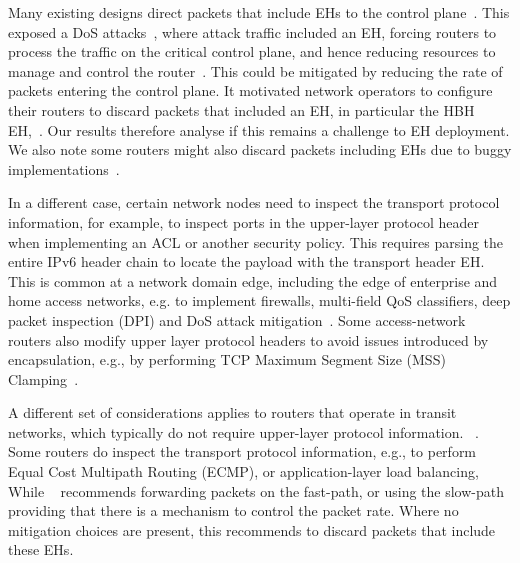 \documentclass[conference]{IEEEtran}
\begin{document}
Many existing designs direct packets that include EHs to the control plane~\cite{ietf-v6ops-hbh-03}.  This exposed a DoS attacks~\cite{naagas2021deh}, where attack traffic included an EH, forcing routers to process the traffic on the critical control plane, and hence reducing resources to manage and control the router~\cite{router-architecture}. This could be mitigated  by reducing the rate of packets entering the control plane. It motivated network operators to configure their routers to discard packets that included an EH, in particular the HBH EH,~\cite{passive-threats}. Our results therefore analyse if this remains a challenge to EH deployment.
We also note some routers might also discard packets including EHs due to buggy implementations~\cite{passive-threats}.

In a different case, certain network nodes need to inspect the transport protocol information, for example, to inspect ports in the upper-layer protocol header when implementing an ACL or another security policy. This requires parsing the entire IPv6 header chain to locate the payload with the transport header EH.
This is common at a network domain edge, including the edge of enterprise and home access networks, e.g. to implement firewalls, multi-field QoS classifiers, deep packet inspection (DPI) and DoS attack mitigation~\cite{lb-classification}. Some access-network routers also modify upper layer protocol headers to avoid issues introduced by encapsulation, e.g., by performing TCP Maximum Segment Size (MSS) Clamping~\cite{custura-mtu}.

A different set of considerations applies to routers that operate in transit networks, which typically do not require upper-layer protocol information.
~\cite{rfc9288}.  Some routers do inspect the transport protocol information, e.g., to perform Equal Cost Multipath Routing (ECMP), or application-layer load balancing, While ~\cite{rfc9288} recommends forwarding packets on the fast-path, or using the slow-path providing that there is a mechanism to control the  packet rate. Where no mitigation choices are present, this recommends to discard packets that include these EHs. 

\end{document}
